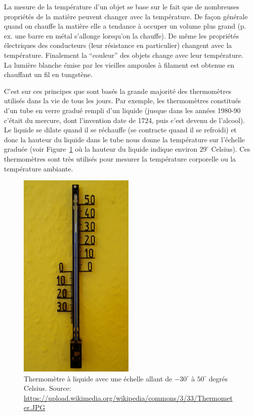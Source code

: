 \documentclass[a4paper,12pt]{book}
\begin{document}
La mesure de la température d'un objet se base sur le fait que de nombreuses propriétés
de la matière peuvent changer avec la température. De façon générale quand on chauffe la matière elle a tendance à occuper un volume plus grand (p. ex. une barre en métal s'allonge lorsqu'on la chauffe). De même les propriétés électriques des conducteurs (leur résistance en particulier) changent avec la température. Finalement la ``couleur'' des objets change avec leur température. La lumière blanche émise par les vieilles ampoules à filament
est obtenue en chauffant un fil en tungstène. 

C'est sur ces principes que sont basés la grande majorité des
thermomètres utilisés dans la vie de tous les jours. Par 
exemple, les thermomètres constitués d'un tube en verre gradué 
rempli d'un liquide (jusque dans les années 1980-90 c'était du mercure, dont l'invention date de 1724, puis c'est devenu de l'alcool). Le liquide se dilate quand il se réchauffe (se contracte quand il se refroidi) et 
donc la hauteur du liquide dans le tube nous donne la température sur l'échelle graduée (voir Figure~\ref{fig_thermo_liquide} où la hauteur du liquide indique environ $29^\circ$ Celsius). Ces thermomètres sont très utilisés pour mesurer la température corporelle ou la température ambiante.
\begin{figure}
\begin{center}
\includegraphics[width=0.5\textwidth]{figs/Thermometer.JPG}
\caption{Thermomètre à liquide avec une échelle allant de $-30^\circ$ à $50^\circ$ degrés Celsius. Source: \url{https://upload.wikimedia.org/wikipedia/commons/3/33/Thermometer.JPG}}
\label{fig_thermo_liquide}
\end{center}
\end{figure} 
\end{document}
